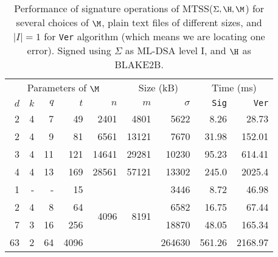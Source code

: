 
    \begin{table*}[htbp]
        \setlength{\tabcolsep}{10pt}
        \centering
        \caption{Performance of signature operations of MTSS($\Sigma, \H, \M$) for several choices of $\M$,
plain text files of different sizes, and $|I| = 1$ for \texttt{Ver} algorithm (which means we are locating one error).
Signed using $\Sigma$ as ML-DSA level I, and $\H$ as BLAKE2B.}
        \begin{tabular}{rrrrrrrrr}
            \toprule
            \multicolumn{5}{c}{Parameters of $\M$} & \multicolumn{2}{c}{Size  (kB)} & \multicolumn{2}{c}{Time (ms)}
            \\
            \cmidrule(lr){1-5} \cmidrule(lr){6-7} \cmidrule(lr){8-9}
            $d$ & $k$ & $q$ & $t$ & $n$ & $m$ & $\sigma$ & \texttt{Sig} & \texttt{Ver} \\
            \midrule
    	2 & 4 & 7 & 49 & 2401 & 4801 & 5622 & 8.26 & 28.73 \\
	2 & 4 & 9 & 81 & 6561 & 13121 & 7670 & 31.98 & 152.01 \\
	3 & 4 & 11 & 121 & 14641 & 29281 & 10230 & 95.23 & 614.41 \\
	4 & 4 & 13 & 169 & 28561 & 57121 & 13302 & 245.0 & 2025.4 \\
	\midrule
                    	1 & - & - & 15 & \multirow{4}{*}{4096} & \multirow{4}{*}{8191} & 3446 & 8.72 & 46.98 \\
                    	2 & 4 & 8 & 64 &  &  & 6582 & 16.75 & 67.44 \\
	7 & 3 & 16 & 256 &  &  & 18870 & 48.05 & 165.34 \\
	63 & 2 & 64 & 4096 &  &  & 264630 & 561.26 & 2168.97 \\

        \bottomrule
      \end{tabular}
      \label{table:sign-locate-different-parameters}
    \end{table*}
